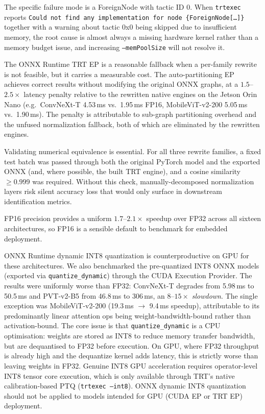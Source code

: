\documentclass[runningheads,a4paper]{llncs}
\begin{document}
The specific failure mode is a ForeignNode with tactic ID 0. When \texttt{trtexec} reports \texttt{Could not find any implementation for node \{ForeignNode[\ldots]\}} together with a warning about tactic 0x0 being skipped due to insufficient memory, the root cause is almost always a missing hardware kernel rather than a memory budget issue, and increasing \texttt{--memPoolSize} will not resolve it.

The ONNX Runtime TRT EP is a reasonable fallback when a per-family rewrite is not feasible, but it carries a measurable cost. The auto-partitioning EP achieves correct results without modifying the original ONNX graphs, at a $1.5$--$2.5\times$ latency penalty relative to the rewritten native engines on the Jetson Orin Nano (e.g.\ ConvNeXt-T 4.53\,ms vs.\ 1.95\,ms FP16, MobileViT-v2-200 5.05\,ms vs.\ 1.90\,ms). The penalty is attributable to sub-graph partitioning overhead and the unfused normalization fallback, both of which are eliminated by the rewritten engines.

Validating numerical equivalence is essential. For all three rewrite families, a fixed test batch was passed through both the original PyTorch model and the exported ONNX (and, where possible, the built TRT engine), and a cosine similarity $\geq 0.999$ was required. Without this check, manually-decomposed normalization layers risk silent accuracy loss that would only surface in downstream identification metrics.

FP16 precision provides a uniform $1.7$--$2.1\times$ speedup over FP32 across all sixteen architectures, so FP16 is a sensible default to benchmark for embedded deployment.

ONNX Runtime dynamic INT8 quantization is counterproductive on GPU for these architectures. We also benchmarked the pre-quantized INT8 ONNX models (exported via \texttt{quantize\_dynamic}) through the CUDA Execution Provider. The results were uniformly worse than FP32: ConvNeXt-T degrades from 5.98\,ms to 50.5\,ms and PVT-v2-B5 from 46.8\,ms to 306\,ms, an $8$--$15\times$ \emph{slowdown}. The single exception was MobileViT-v2-200 (19.3\,ms $\to$ 9.4\,ms speedup), attributable to its predominantly linear attention ops being weight-bandwidth-bound rather than activation-bound. The core issue is that \texttt{quantize\_dynamic} is a CPU optimisation: weights are stored as INT8 to reduce memory transfer bandwidth, but are dequantised to FP32 before execution. On GPU, where FP32 throughput is already high and the dequantize kernel adds latency, this is strictly worse than leaving weights in FP32. Genuine INT8 GPU acceleration requires operator-level INT8 tensor core execution, which is only available through TRT's native calibration-based PTQ (\texttt{trtexec --int8}). ONNX dynamic INT8 quantization should not be applied to models intended for GPU (CUDA EP or TRT EP) deployment.
\end{document}
